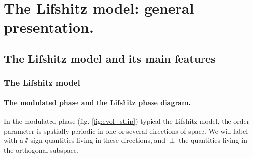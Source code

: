 
\chapter{The Lifshitz model: general presentation.}

\section{The Lifshitz model and its main features}

\subsection{The Lifshitz model}

\subsubsection{The modulated phase and the Lifshitz phase diagram.}


In the modulated phase (fig. \eqref{fig:evol_strip}) typical the Lifshitz model, the order parameter is spatially periodic in one or several directions of space. We will label with a $\sslash$ sign quantities living in these directions, and $\perp$ the quantities living in the orthogonal subspace.

